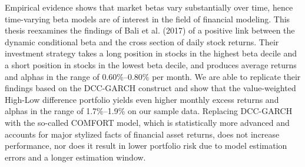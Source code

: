 Empirical evidence shows that market betas vary substantially over time, hence time-varying beta models are of interest in the field of financial modeling. This thesis reexamines the findings of Bali et al. (2017) of a positive link between the dynamic conditional beta and the cross section of daily stock returns. Their investment strategy takes a long position in stocks in the highest beta decile and a short position in stocks in the lowest beta decile, and produces average returns and alphas in the range of 0.60\%–0.80\% per month. We are able to replicate their findings based on the DCC-GARCH construct and show that the value-weighted High-Low difference portfolio yields even higher monthly excess returns and alphas in the range of 1.7\%–1.9\% on our sample data. Replacing DCC-GARCH with the so-called COMFORT model, which is statistically more advanced and accounts for major stylized facts of financial asset returns, does not increase performance, nor does it result in lower portfolio risk due to model estimation errors and a longer estimation window.